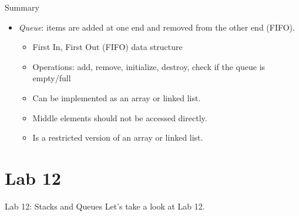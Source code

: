 \documentclass[14pt,aspectratio=1610]{beamer}
\begin{document}
\begin{frame}{Summary}
\begin{itemize}
\item
  \emph{Queue}: items are added at one end and removed from the other end (FIFO).
  \begin{itemize}
  \item
    First In, First Out (FIFO) data structure
  \item
    Operations: add, remove, initialize, destroy, check if the queue is empty/full
  \item
    Can be implemented as an array or linked list.
  \item
    Middle elements should not be accessed directly.
  \item
    Is a restricted version of an array or linked list.
  \end{itemize}
\end{itemize}
\end{frame}


\section*{Lab 12}
\begin{frame}{Lab 12: Stacks and Queues}
\centering\Large
  Let's take a look at Lab 12.
\end{frame}
\end{document}
